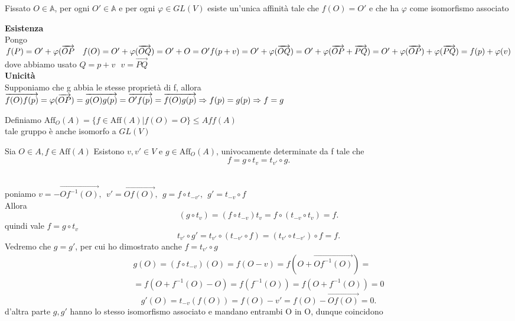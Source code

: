 \documentclass[12px]{article}
\begin{document}
\begin{lemm}
	Fissato $O\in \mathbb{A} $, per ogni $O'\in \mathbb{A} $ e per ogni $ \varphi\in GL(V) $ esiste un'unica affinità tale che $f(O) = O'$ e che ha $ \varphi$ come isomorfismo associato
\end{lemm}
\begin{dimo}
	\textbf{Esistenza}\\
	Pongo $f(P) = O' + \varphi(\overrightarrow{OP} \ \ \ f(O) = O' + \varphi(\overrightarrow{OQ}) = O' + O = O'\\
	f(p + v) = O' + \varphi(\overrightarrow{OQ}) = O' + \varphi(\overrightarrow{OP} + \overrightarrow{PQ}) = O' + \varphi(\overrightarrow{OP}) + \varphi(\overrightarrow{PQ}) = f(p) + \varphi(v)$\\
	dove abbiamo usato $Q = p + v \ \ \ v = \overrightarrow{PQ}$\\
	\textbf{Unicità}\\
	Supponiamo che g abbia le stesse proprietà di f, allora \\
	$\overrightarrow{f(O)f(p)} = \varphi(\overrightarrow{OP}) = \overrightarrow{g(O)g(p)} = \overrightarrow{O'f(p)} = \overrightarrow{f(O)g(p)} \Rightarrow f(p) = g(p)\\ \Rightarrow  f = g $
\end{dimo} \newpage
\begin{defi}
	Definiamo 
	$\text{Aff}_O(A) = \{f\in \text{Aff}(A) | f(O) = O\} \leq Aff(A)$\\
	tale gruppo è anche isomorfo a $GL(V)$
\end{defi}
\begin{lemm}
	Sia $O\in A, f \in\text{Aff}(A)$ Esistono $v,v'\in V$ e $g\in\text{Aff}_O(A)$, univocamente determinate da f tale che
	\[
		f = g \circ t_v = t_{v'}\circ g
	.\] 
\end{lemm}
\begin{dimo}\ \\
	poniamo $v = -\overrightarrow{Of^{-1}(O)}, \ \ v' = \overrightarrow{Of(O)}, \ \  g = f\circ t_{-v'}, \ \  g' = t_{-v}\circ f$ \\
	Allora
	\[
		(g \circ t_v) = (f\circ t_{-v})t_v = f\circ(t_{-v}\circ t_v) = f
	.\] 
	quindi vale $f = g\circ t_v$
	\[
		t_{v'}\circ g' = t_{v'}\circ (t_{-v'}\circ f) = (t_{v'}\circ t_{-v'})\circ f = f
	.\] 
	Vedremo che $g = g'$, per cui ho dimostrato anche $f = t_{v'}\circ g$ \\
	\begin{gather*}
		g(O) = (f\circ t_{-v})(O) = f(O-v) = f(O + \overrightarrow{Of^{-1}(O)}) = \\ = f(O + f^{-1}(O) - O) = f(f^{-1}(O)) = f(O + f^{-1}(O)) = 0
	\end{gather*}
	\[
		g'(O) = t_{-v}(f(O)) = f(O) - v' = f(O) - \overrightarrow{Of(O)} = 0
	.\]
	d'altra parte $g, g'$ hanno lo stesso isomorfismo associato e mandano entrambi O in O, dunque coincidono
\end{dimo}
\end{document}
